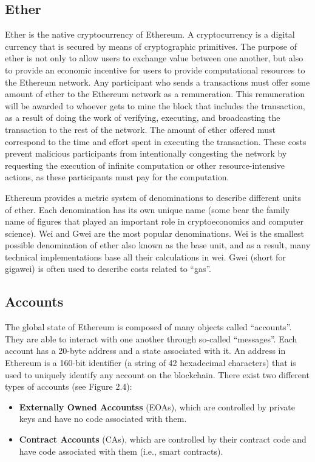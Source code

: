     \subsection{Ether}
        Ether is the native cryptocurrency of Ethereum.
        A cryptocurrency is a digital currency that is secured by means of cryptographic primitives.
        The purpose of ether is not only to allow users to exchange value between one another, but also to provide an economic incentive for users to provide computational resources to the Ethereum network.
        Any participant who sends a transactions must offer some amount of ether to the Ethereum network as a remuneration.
        This remuneration will be awarded to whoever gets to mine the block that includes the transaction, as a result of doing the work of verifying, executing, and broadcasting the transaction to the rest of the network.
        The amount of ether offered must correspond to the time and effort spent in executing the transaction.
        These costs prevent malicious participants from intentionally congesting the network by requesting the execution of infinite computation or other resource-intensive actions, as these participants must pay for the computation.

        Ethereum provides a metric system of denominations to describe different units of ether.
        Each denomination has its own unique name (some bear the family name of figures that played an important role in cryptoeconomics and computer science).
        Wei and Gwei are the most popular denominations.
        Wei is the smallest possible denomination of ether also known as the base unit, and as a result, many technical implementations base all their calculations in wei.
        Gwei (short for gigawei) is often used to describe costs related to “gas”.

    \subsection{Accounts}
        The global state of Ethereum is composed of many objects called “accounts”.
        They are able to interact with one another through so-called “messages”.
        Each account has a 20-byte address and a state associated with it.
        An address in Ethereum is a 160-bit identifier (a string of 42 hexadecimal characters) that is used to uniquely identify any account on the blockchain.
        There exist two different types of accounts (see Figure 2.4):
        
        \begin{itemize}
            \item \textbf{Externally Owned Accountss} (EOAs), which are controlled by private keys and have no code associated with them.
            \item \textbf{Contract Accounts} (CAs), which are controlled by their contract code and have code associated with them (i.e., smart contracts).
        \end{itemize}

